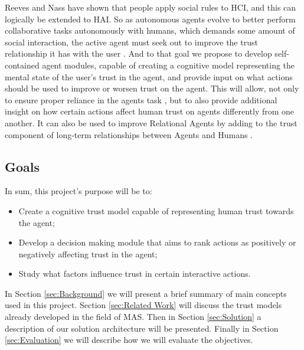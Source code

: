 Reeves and Nass have shown that people apply social rules to \ac{HCI}, and this can logically be extended to \ac{HAI}\cite{Reeves1998a}. So as autonomous agents evolve to better perform collaborative tasks autonomously with humans, which demands some amount of social interaction, the active agent must seek out to improve the trust relationship it has with the user \cite{Lashkari1994}. And to that goal we propose to develop self-contained agent modules, capable of creating a cognitive model representing the mental state of the user's trust in the agent, and provide input on what actions should be used to improve or worsen trust on the agent. This will allow, not only to ensure proper reliance in the agents task \cite{Lee2004}, but to also provide additional insight on how certain actions affect human trust on agents differently from one another. It can also be used to improve Relational Agents by adding to the trust component of long-term relationships between Agents and Humans \cite{Bickmore2001b}.


\subsection{Goals}
\label{subsec:Goals}

In sum, this project's purpose will be to:
\begin{itemize}
	\item Create a cognitive trust model capable of representing human trust towards the agent;
	\item Develop a decision making module that aims to rank actions as positively or negatively affecting trust in the agent;
	\item Study what factors influence trust in certain interactive actions.
\end{itemize}


In Section \ref{sec:Background} we will present a brief summary of main concepts used in this project. Section \ref{sec:Related Work} will discuss the trust models already developed in the field of \ac{MAS}. Then in Section \ref{sec:Solution} a description of our solution architecture will be presented. Finally in Section \ref{sec:Evaluation} we will describe how we will evaluate the objectives.



